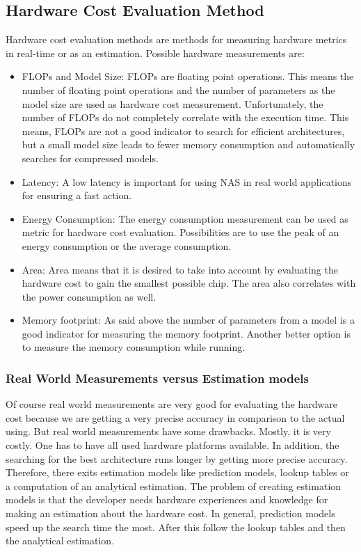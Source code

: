 \documentclass[conference]{IEEEtran}
\begin{document}
\subsection{Hardware Cost Evaluation Method}
Hardware cost evaluation methods are methods for measuring hardware metrics in real-time or as an estimation. Possible hardware measurements are: 

\begin{itemize}
\item FLOPs and Model Size: FLOPs are floating point operations. This means the number of floating point operations and the number of parameters as the model size are used as hardware cost measurement. Unfortunately, the number of FLOPs do not completely correlate with the execution time. This means, FLOPs are not a good indicator to search for efficient architectures, but a small model size leads to fewer memory consumption and automatically searches for compressed models. 
\item Latency: A low latency is important for using NAS in real world applications for ensuring a fast action. 
\item Energy Consumption: The energy consumption measurement can be used as metric for hardware cost evaluation. Possibilities are to use the peak of an energy consumption or the average consumption.
\item Area: Area means that it is desired to take into account by evaluating the hardware cost to gain the smallest possible chip. The area also correlates with the power consumption as well.
\item Memory footprint: As said above the number of parameters from a model is a good indicator for measuring the memory footprint. Another better option is to measure the memory consumption while running.     
\end{itemize}

\subsubsection{Real World Measurements versus Estimation models}

Of course real world measurements are very good for evaluating the hardware cost because we are getting a very precise accuracy in comparison to the actual using. But real world measurements have some drawbacks. Mostly, it is very costly. One has to have all used hardware platforms available. In addition, the searching for the best architecture runs longer by getting more precise accuracy. Therefore, there exits estimation models like prediction models, lookup tables or a computation of an analytical estimation. The problem of creating estimation models is that the developer needs hardware experiences and knowledge for making an estimation about the hardware cost. In general, prediction models speed up the search time the most. After this follow the lookup tables and then the analytical estimation. 
\end{document}
